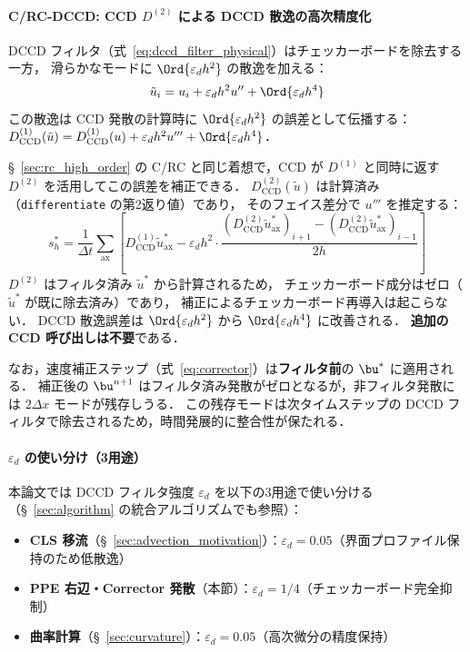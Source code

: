 \paragraph{C/RC-DCCD: CCD $D^{(2)}$ による DCCD 散逸の高次精度化}

DCCD フィルタ（式~\eqref{eq:dccd_filter_physical}）はチェッカーボードを除去する一方，
滑らかなモードに $\Ord{\varepsilon_d h^2}$ の散逸を加える：
\[
  \tilde{u}_i = u_i + \varepsilon_d h^2 u'' + \Ord{\varepsilon_d h^4}
\]
この散逸は CCD 発散の計算時に $\Ord{\varepsilon_d h^2}$ の誤差として伝播する：
$D^{(1)}_\mathrm{CCD}(\tilde{u}) = D^{(1)}_\mathrm{CCD}(u) + \varepsilon_d h^2 u''' + \Ord{\varepsilon_d h^4}$．

§~\ref{sec:rc_high_order} の C/RC と同じ着想で，CCD が $D^{(1)}$ と同時に返す $D^{(2)}$
を活用してこの誤差を補正できる．
$D^{(2)}_\mathrm{CCD}(\tilde{u})$ は計算済み（\texttt{differentiate} の第2返り値）であり，
そのフェイス差分で $u'''$ を推定する：
\begin{equation}
  s_h^* = \frac{1}{\Delta t}\sum_\mathrm{ax}
    \left[
      D^{(1)}_\mathrm{CCD}\tilde{u}^*_\mathrm{ax}
      - \varepsilon_d h^2 \cdot
        \frac{(D^{(2)}_\mathrm{CCD}\tilde{u}^*_\mathrm{ax})_{i+1}
              - (D^{(2)}_\mathrm{CCD}\tilde{u}^*_\mathrm{ax})_{i-1}}{2h}
    \right]
  \label{eq:crc_dccd}
\end{equation}
$D^{(2)}$ はフィルタ済み $\tilde{u}^*$ から計算されるため，
チェッカーボード成分はゼロ（$\tilde{u}^*$ が既に除去済み）であり，
補正によるチェッカーボード再導入は起こらない．
DCCD 散逸誤差は $\Ord{\varepsilon_d h^2}$ から $\Ord{\varepsilon_d h^4}$ に改善される．
\textbf{追加の CCD 呼び出しは不要}である．

なお，速度補正ステップ（式~\eqref{eq:corrector}）は\textbf{フィルタ前}の $\bu^*$ に適用される．
補正後の $\bu^{n+1}$ はフィルタ済み発散がゼロとなるが，非フィルタ発散には $2\Delta x$ モードが残存しうる．
この残存モードは次タイムステップの DCCD フィルタで除去されるため，時間発展的に整合性が保たれる．

\paragraph{$\varepsilon_d$ の使い分け（3用途）}
本論文では DCCD フィルタ強度 $\varepsilon_d$ を以下の3用途で使い分ける
（§~\ref{sec:algorithm} の統合アルゴリズムでも参照）：
\begin{itemize}[noitemsep]
  \item \textbf{CLS 移流}（§~\ref{sec:advection_motivation}）：$\varepsilon_d = 0.05$（界面プロファイル保持のため低散逸）
  \item \textbf{PPE 右辺・Corrector 発散}（本節）：$\varepsilon_d = 1/4$（チェッカーボード完全抑制）
  \item \textbf{曲率計算}（§~\ref{sec:curvature}）：$\varepsilon_d = 0.05$（高次微分の精度保持）
\end{itemize}

